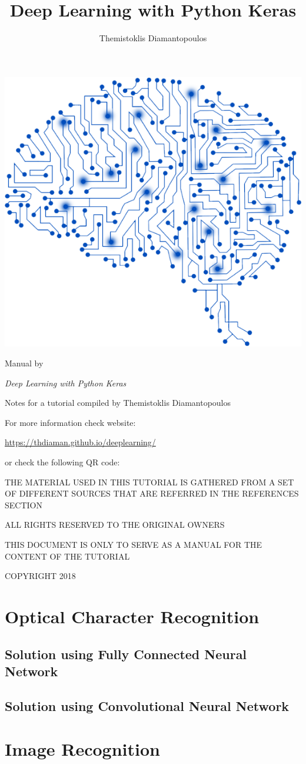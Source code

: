 \documentclass[10pt,twoside,a4paper,openany]{memoir}
\author{Themistoklis Diamantopoulos}
\title{Deep Learning with Python Keras}
\date{}
\makeatletter
\def\maketitle{%
  \null
  \thispagestyle{empty}%
  \vfill

  \begin{center}
    \normalfont
    \centering

    \begin{minipage}{\linewidth}
    \centering
    \includegraphics[scale=0.3]{images/box-icon.png}
    \end{minipage}

    \vskip 1cm
    
    {\huge\@title\par}%
    \hrulefill\par
    \vskip 1cm

    {\LARGE\raggedleft Manual by \@author\par}%
  \end{center}%
  \vfill
  \null
  \clearpage
  }
\makeatother
\begin{document}
\maketitle

\frontmatter

\null
\thispagestyle{empty}%
\vfill

\begin{flushleft}
\textit{Deep Learning with Python Keras}

Notes for a tutorial compiled by Themistoklis Diamantopoulos

\vskip 0.2cm

For more information check website:

\url{https://thdiaman.github.io/deeplearning/}

or check the following QR code:

\vskip 0.2cm


\bigskip

THE MATERIAL USED IN THIS TUTORIAL IS GATHERED FROM A SET OF DIFFERENT SOURCES THAT ARE REFERRED IN THE REFERENCES SECTION

\vskip 0.2cm
ALL RIGHTS RESERVED TO THE ORIGINAL OWNERS

\vskip 0.2cm
THIS DOCUMENT IS ONLY TO SERVE AS A MANUAL FOR THE CONTENT OF THE TUTORIAL

\vskip 0.2cm
COPYRIGHT 2018

\end{flushleft}



\mainmatter

\chapter{Optical Character Recognition}

\section{Solution using Fully Connected Neural Network}


\section{Solution using Convolutional Neural Network}


\chapter{Image Recognition}
\end{document}
